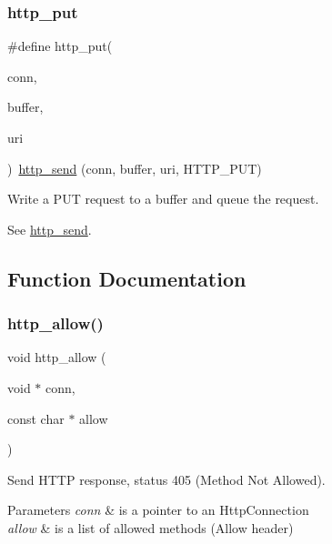 \subsubsection{\texorpdfstring{http\+\_\+put}{http\_put}}
{\footnotesize\ttfamily \#define http\+\_\+put(\begin{DoxyParamCaption}\item[{}]{conn,  }\item[{}]{buffer,  }\item[{}]{uri }\end{DoxyParamCaption})~\hyperlink{group__http__connection_ga9d3a703c0cf3b053e915eaec5b394c28}{http\+\_\+send} (conn, buffer, uri, H\+T\+T\+P\+\_\+\+P\+UT)}



Write a P\+UT request to a buffer and queue the request. 

See \hyperlink{group__http__connection_ga9d3a703c0cf3b053e915eaec5b394c28}{http\+\_\+send}. 

\subsection{Function Documentation}
\mbox{\label{group__http__connection_ga1aeb6fb256def5da05c835071e41dfa0}} 
\subsubsection{\texorpdfstring{http\+\_\+allow()}{http\_allow()}}
{\footnotesize\ttfamily void http\+\_\+allow (\begin{DoxyParamCaption}\item[{void $\ast$}]{conn,  }\item[{const char $\ast$}]{allow }\end{DoxyParamCaption})}



Send H\+T\+TP response, status 405 (Method Not Allowed). 


\begin{DoxyParams}{Parameters}
{\em conn} & is a pointer to an Http\+Connection \\
\hline
{\em allow} & is a list of allowed methods (Allow header) \\
\hline
\end{DoxyParams}
\mbox{\label{group__http__connection_ga92f8776c838fb93b9ea9aedfc665a694}} 
